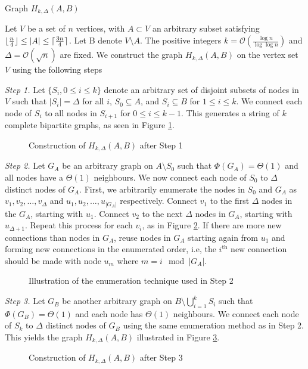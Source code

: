 \begin{definition}\label{def:HkAB}
 	Graph $H_{k, \Delta}(A,B)$

	Let $V$ be a set of $n$ vertices, with $A \subset V$ an arbitrary subset satisfying $\lfloor\frac{n}{4}\rfloor \leq |A| \leq \lceil\frac{3n}{4}\rceil$.
	Let B denote $V \setminus A$. The positive integers $k = \mathcal{O}\left(\frac{\log n}{\log \log n}\right)$ and $\Delta = \mathcal{O}(\sqrt{n})$ are fixed. We construct the graph $H_{k, \Delta}(A,B)$ on the vertex set $V$ using the following steps

	\textit{Step 1.} Let $\{S_i, 0 \leq i \leq k\}$ denote an arbitrary set of disjoint subsets of nodes in $V$ such that $|S_i| = \Delta$ for all $i$, $S_0 \subseteq A$, and $S_i \subseteq B$ for $1 \leq i \leq k$. We connect each node of $S_i$ to all nodes in $S_{i+1}$ for $0 \leq i \leq k - 1$. This generates a string of $k$ complete bipartite graphs, as seen in Figure \ref{fig:HkAB_1}.

    \begin{figure}[h]
        \centering
        
        \caption{Construction of $H_{k, \Delta}(A,B)$ after Step 1}
        \label{fig:HkAB_1}
    \end{figure} 

	\textit{Step 2.} Let $G_A$ be an arbitrary 
	graph on $A \setminus S_0$ such that $\Phi(G_A) = \Theta(1)$ and all nodes have a $\Theta(1)$ neighbours. %
	We now connect each node of $S_0$ to $\Delta$ distinct nodes of $G_A$. First, we arbitrarily enumerate the nodes in $S_0$ and $G_A$ as $v_1, v_2, \dots, v_\Delta$ and $u_1, u_2, \dots, u_{|G_A|}$ respectively. Connect $v_1$ to the first $\Delta$ nodes in the $G_A$, starting with $u_1$. Connect $v_2$ to the next $\Delta$ nodes in $G_A$, starting with $u_{\Delta + 1}$.
	Repeat this process for each $v_i$, as in Figure \ref{fig:HkAB_2}.
	If there are more new connections than nodes in $G_A$, reuse nodes in $G_A$ starting again from $u_1$ and forming new connections in the enumerated order, i.e, the $i^\text{th}$ new connection should be made with node $u_m$ where $m = i\mod |G_A|$.

    \begin{figure}[h]
        \centering
        
        \caption{Illustration of the enumeration technique used in Step 2}
        \label{fig:HkAB_2}
    \end{figure}

	\textit{Step 3.} Let $G_B$ be another arbitrary graph on $B \setminus \bigcup_{i=1}^k S_i$ such that $\Phi(G_B) = \Theta(1)$ and each node has $\Theta(1)$ neighbours. 
	We connect each node of $S_k$ to $\Delta$ distinct nodes of $G_B$ using the same enumeration method as in Step 2. This yields the graph $H_{k, \Delta}(A,B)$ illustrated in Figure \ref{fig:HkAB_3}.

    \begin{figure}[h]
        \centering
        
        \caption{Construction of $H_{k, \Delta}(A,B)$ after Step 3}
        \label{fig:HkAB_3}
    \end{figure}

\end{definition}

